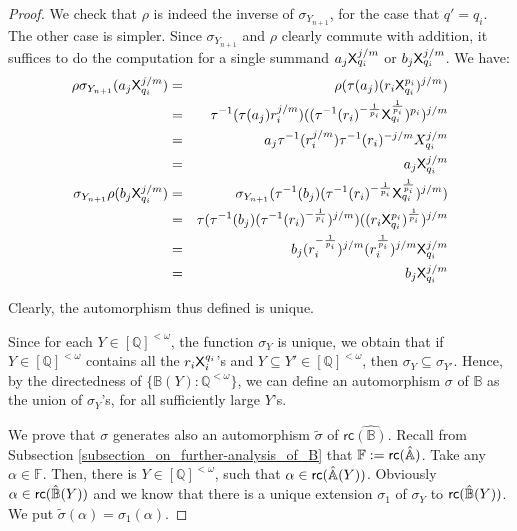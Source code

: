 \documentclass{amsart}
\newcommand{\X}{{\sf X}}
\newcommand{\rc}{{\sf rc}}
\newcommand{\fsvar}{Y}
\newcommand{\fsvard}{Y}
\begin{document}
\begin{proof}
     We check that $\rho$ is indeed the inverse of $\sigma_{\fsvar_{n+1}}$, for the case that $q'=q_i$. The other
     case is simpler. Since $\sigma_{\fsvar_{n+1}}$ and $\rho$ clearly commute with addition, it suffices
     to do the computation for a single summand $a_j\X_{q_i}^{j/m}$ or $b_j\X_{q_i}^{j/m}$.
     We have:   
\begin{eqnarray*}
\rho \sigma_{\fsvar_{n+1}}(a_j\X_{q_i}^{j/m}) & = & 
\rho(\tau(a_j)(r_i\X_{q_i}^{p_i})^{j/m}) \\
 & = &  \tau^{-1}(\tau(a_j)r_i^{j/m})((\tau^{-1}(r_i)^{-\frac{1}{p_i}}\X_{q_i}^{\frac{1}{p_i}})^{p_i})^{j/m} \\
 & = &  a_j\tau^{-1}(r_i^{j/m})\tau^{-1}(r_i)^{-j/m}X_{q_i}^{j/m} \\
 & = & a_j\X^{j/m}_{q_i}\\
 \sigma_{\fsvar_{n+1}}\rho( b_j\X_{q_i}^{j/m}) & = & 
 \sigma_{\fsvar_{n+1}}( \tau^{-1}(b_j)(\tau^{-1}(r_i)^{-\frac{1}{p_i}}\X_{q_i}^{\frac{1}{p_i}})^{j/m})\\
 & = &  \tau(\tau^{-1}(b_j)(\tau^{-1}(r_i)^{-\frac{1}{p_i}})^{j/m})
 ((r_i\X_{q_i}^{p_i})^{\frac{1}{p_i}})^{j/m} \\
 &=&  b_j(r_i^{-\frac{1}{p_i}})^{j/m}(r_i^{\frac{1}{p_i}})^{j/m}\X_{q_i}^{j/m}\\
 &=& b_j\X_{q_i}^{j/m}
\end{eqnarray*}

     
    Clearly, the automorphism thus defined is unique.

    Since for each $\fsvard\in[\mathbb{Q}]^{<\omega}$, the function $\sigma_\fsvard$ is unique, we obtain that if $\fsvard\in[\mathbb{Q}]^{<\omega}$ contains all the $r_i\X_i^{q_i}$'s and 
    $\fsvard\subseteq \fsvard'\in[\mathbb{Q}]^{<\omega}$, 
    then $\sigma_\fsvard\subseteq \sigma_{\fsvard'}$. Hence,
    by the directedness of $\{\mathbb{B}(\fsvard): \mathbb{Q}^{<\omega}\}$, we can define an automorphism $\sigma$ of 
    $\mathbb{B}$ as the union of $\sigma_\fsvard$'s, for all sufficiently large $\fsvard$'s.

    We prove that $\sigma$ generates also an automorphism $\widetilde{\sigma}$ of $\mathsf{rc}\hat{(\mathbb{B})}$. Recall from Subsection \ref{subsection_on_further-analysis_of_B} that $\mathbb{F}:= \rc(\hat{\mathbb{A}})$.   Take any $\alpha\in\mathbb{F} $.
    Then, there is $\fsvar\in[\mathbb{Q}]^{<\omega}$, 
    such that $\alpha\in\rc(\hat{\mathbb{A}}(\fsvar))$. Obviously $\alpha\in \rc(\hat{\mathbb{B}}({\fsvar}))$ 
    and we know that there is a unique extension $\sigma_1$ of $\sigma_{\fsvar}$ to $\rc(\hat{\mathbb{B}}(\fsvar))$. 
    We put $\widetilde{\sigma}(\alpha) = \sigma_1(\alpha)$.
\end{proof}
\end{document}
